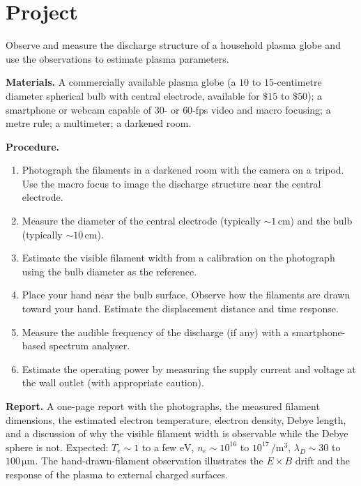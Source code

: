 \section{Project}

\begin{project}
Observe and measure the discharge structure of a household plasma
globe and use the observations to estimate plasma parameters.

\textbf{Materials.}
A commercially available plasma globe (a $10$ to $15$-centimetre
diameter spherical bulb with central electrode, available for
$\$15$ to $\$50$); a smartphone or webcam capable of $30$- or
$60$-fps video and macro focusing; a metre rule; a multimeter; a
darkened room.

\textbf{Procedure.}
\begin{enumerate}
  \item Photograph the filaments in a darkened room with the camera
    on a tripod. Use the macro focus to image the discharge structure
    near the central electrode.
  \item Measure the diameter of the central electrode (typically
    $\sim 1\,\si{\centi\meter}$) and the bulb (typically $\sim
    10\,\si{\centi\meter}$).
  \item Estimate the visible filament width from a calibration on
    the photograph using the bulb diameter as the reference.
  \item Place your hand near the bulb surface. Observe how the
    filaments are drawn toward your hand. Estimate the displacement
    distance and time response.
  \item Measure the audible frequency of the discharge (if any) with
    a smartphone-based spectrum analyser.
  \item Estimate the operating power by measuring the supply current
    and voltage at the wall outlet (with appropriate caution).
\end{enumerate}

\textbf{Report.} A one-page report with the photographs, the
measured filament dimensions, the estimated electron temperature,
electron density, Debye length, and a discussion of why the visible
filament width is observable while the Debye sphere is not. Expected:
$T_{e}\sim 1$ to a few $\si{\electronvolt}$, $n_{e}\sim
10^{16}$ to $10^{17}\,\si{\per\meter\cubed}$, $\lambda_{D}\sim 30$ to
$100\,\si{\micro\meter}$. The hand-drawn-filament observation
illustrates the $E\times B$ drift and the response of the plasma to
external charged surfaces.
\end{project}

